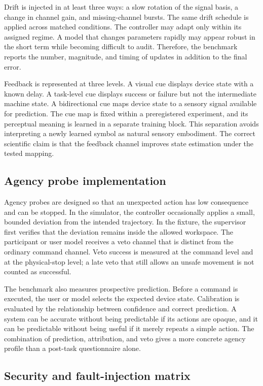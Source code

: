\documentclass[conference]{IEEEtran}
\begin{document}
Drift is injected in at least three ways: a slow rotation of the signal basis, a change in channel gain, and missing-channel bursts. The same drift schedule is applied across matched conditions. The controller may adapt only within its assigned regime. A model that changes parameters rapidly may appear robust in the short term while becoming difficult to audit. Therefore, the benchmark reports the number, magnitude, and timing of updates in addition to the final error.

Feedback is represented at three levels. A visual cue displays device state with a known delay. A task-level cue displays success or failure but not the intermediate machine state. A bidirectional cue maps device state to a sensory signal available for prediction. The cue map is fixed within a preregistered experiment, and its perceptual meaning is learned in a separate training block. This separation avoids interpreting a newly learned symbol as natural sensory embodiment. The correct scientific claim is that the feedback channel improves state estimation under the tested mapping.

\subsection{Agency probe implementation}

Agency probes are designed so that an unexpected action has low consequence and can be stopped. In the simulator, the controller occasionally applies a small, bounded deviation from the intended trajectory. In the fixture, the supervisor first verifies that the deviation remains inside the allowed workspace. The participant or user model receives a veto channel that is distinct from the ordinary command channel. Veto success is measured at the command level and at the physical-stop level; a late veto that still allows an unsafe movement is not counted as successful.

The benchmark also measures prospective prediction. Before a command is executed, the user or model selects the expected device state. Calibration is evaluated by the relationship between confidence and correct prediction. A system can be accurate without being predictable if its actions are opaque, and it can be predictable without being useful if it merely repeats a simple action. The combination of prediction, attribution, and veto gives a more concrete agency profile than a post-task questionnaire alone.

\subsection{Security and fault-injection matrix}
\end{document}
